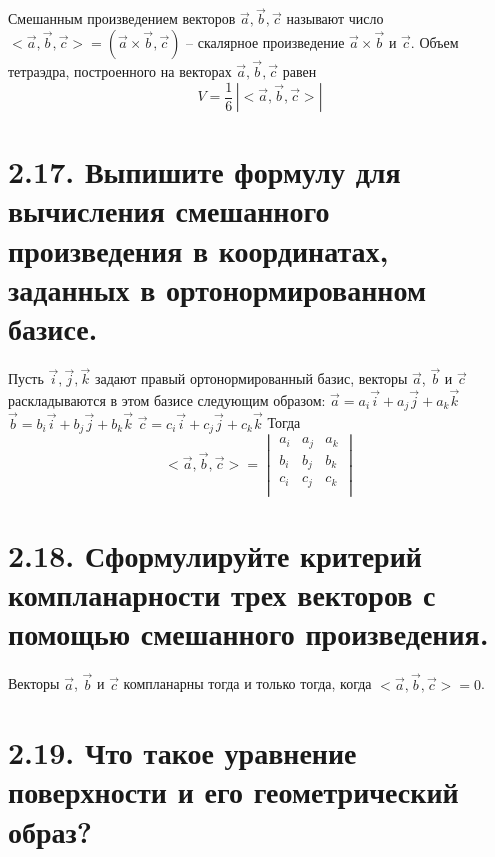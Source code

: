 \documentclass{article}
\begin{document}
Смешанным произведением векторов $\vec{a}, \vec{b}, \vec{c}$ называют число $<\vec{a}, \vec{b}, \vec{c}> = (\vec{a} \times \vec{b}, \vec{c})$ -- скалярное произведение $\vec{a} \times \vec{b}$ и $\vec{c}$.  Объем тетраэдра, построенного на векторах $\vec{a}, \vec{b}, \vec{c}$ равен
$$
V = \frac{1}{6}\,|<\vec{a}, \vec{b}, \vec{c}>|
$$

\section*{\LARGE 2.17. Выпишите формулу для вычисления смешанного произведения в координатах, заданных в ортонормированном базисе.  }

Пусть $\vec{i}, \vec{j}, \vec{k}$ задают правый ортонормированный базис, векторы $\vec{a}$, $\vec{b}$ и $\vec{c}$ раскладываются в этом базисе следующим образом:
\newline $\vec{a} = a_i\vec{i} + a_j\vec{j} + a_k\vec{k}$
\newline $\vec{b} = b_i\vec{i} + b_j\vec{j} + b_k\vec{k}$
\newline $\vec{c} = c_i\vec{i} + c_j\vec{j} + c_k\vec{k}$
\newline Тогда 
$$<\vec{a}, \vec{b}, \vec{c}> = 
\begin{vmatrix}
a_i & a_j & a_k \\
b_i & b_j & b_k \\
c_i & c_j & c_k \\
\end{vmatrix}$$

\section*{\LARGE 2.18. Сформулируйте критерий компланарности трех векторов с помощью смешанного произведения. }

Векторы $\vec{a}$, $\vec{b}$ и $\vec{c}$ компланарны тогда и только тогда, когда $<\vec{a}, \vec{b}, \vec{c}> = 0$.

\section*{\LARGE 2.19. Что такое уравнение поверхности и его геометрический образ? }
\end{document}
